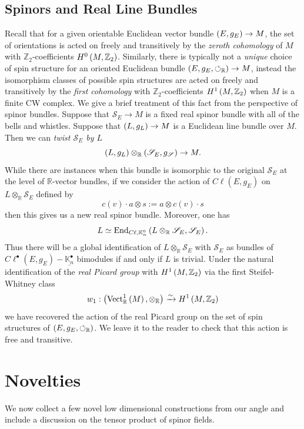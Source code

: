 \documentclass[openany, 11pt]{article}
\theoremstyle{definition}
\theoremstyle{remark}
\def\lp{\ensuremath{\left(}}
\def\rp{\ensuremath{\right)}}
\def\Sc{\ensuremath{\mathscr{S}}}
\def\cal{\ensuremath{\boldsymbol{\circlearrowleft}}}
\def\bR{\ensuremath{\mathbb{R}}}
\def\bZ{\ensuremath{\mathbb{Z}}}
\def\bK{\ensuremath{\mathbb{K}}}
\def\End{\ensuremath{\textnormal{End}}}
\begin{document}
\subsection{Spinors and Real Line Bundles}
Recall that for a given orientable Euclidean vector bundle $\lp E,g_E\rp\rightarrow M$, the set of orientations is acted on freely and transitively by the \emph{zeroth cohomology} of $M$ with $\bZ_2$-coefficients $H^0\lp M,\bZ_2\rp$. Similarly, there is typically not a \emph{unique} choice of spin structure for an oriented Euclidean bundle $\lp E,g_E,\cal_{\bR}\rp\rightarrow M$, instead the isomorphism classes of possible spin structures are acted on freely and transitively by the \emph{first cohomology} with $\bZ_2$-coefficients $H^1\lp M,\bZ_2\rp$ when $M$ is a finite CW complex. We give a brief treatment of this fact from the perspective of spinor bundles. Suppose that $\Sc_E\rightarrow M$ is a fixed real spinor bundle with all of the bells and whistles. Suppose that $\lp L,g_L\rp\rightarrow M$ is a Euclidean line bundle over $M$. Then we can \emph{twist $\Sc_E$ by $L$} 
\[
    \lp L,g_L\rp\otimes_{\bR}\lp \Sc_E,g_{\Sc}\rp\rightarrow M.
\]
While there are instances when this bundle is isomorphic to the original $\Sc_E$ at the level of $\bR$-vector bundles, if we consider the action of $C\ell(E,g_E)$ on $L\otimes_{\bR}\Sc_E$ defined by
\[
    c(v)\cdot a\otimes s:=a\otimes c(v)\cdot s
\]
then this gives us a new real spinor bundle. Moreover, one has 
\[
    L\simeq \End_{C\ell,\bK_n^0}\lp L\otimes_{\bR} \Sc_E,\Sc_E\rp.
\]
Thus there will be a global identification of $L\otimes_{\bR}\Sc_E$ with $\Sc_E$ as bundles of $C\ell^{\bullet}(E,g_E)-\underline{\bK_n^{\bullet}}$ bimodules if and only if $L$ is trivial. Under the natural identification of the \emph{real Picard group} with $H^1\lp M,\bZ_2\rp$ via the first Steifel-Whitney class
\[
    w_1:\lp \text{Vect}^1_{\bR}\lp M\rp,\otimes_{\bR}\rp\xrightarrow{\sim}H^1\lp M,\bZ_2\rp
\]
we have recovered the action of the real Picard group on the set of spin structures of $\lp E,g_E,\cal_{\bR}\rp$. We leave it to the reader to check that this action is free and transitive. 
\section{Novelties}
We now collect a few novel low dimensional constructions from our angle and include a discussion on the tensor product of spinor fields.
\end{document}
